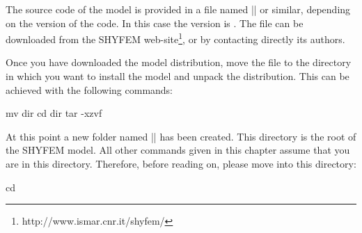 
The source code of the model is provided in a file named |\shydist|
or similar, depending on the version of the code. In this case the
version is \version.  The file can be downloaded from the SHYFEM
web-site\footnote{http://www.ismar.cnr.it/shyfem/}, or by contacting
directly its authors.

Once you have downloaded the model distribution, move the file to
the directory in which you want to install the model and unpack the
distribution. This can be achieved with the following commands:

\begin{codem}
    mv \shydist dir
    cd dir
    tar -xzvf \shydist
\end{codem}

At this point a new folder named |\shydir| has been created. 
This directory is the root of the SHYFEM model. All other commands
given in this chapter assume that you are in this directory. 
Therefore, before reading on, please move into this directory:

\begin{codem}
    cd \shydir
\end{codem}





